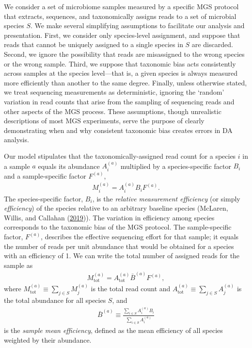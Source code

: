 \documentclass[
]{article}
\begin{document}
We consider a set of microbiome samples measured by a specific MGS protocol that extracts, sequences, and taxonomically assigns reads to a set of microbial species \(S\).
We make several simplifying assumptions to facilitate our analysis and presentation.
First, we consider only species-level assignment, and suppose that reads that cannot be uniquely assigned to a single species in \(S\) are discarded.
Second, we ignore the possibility that reads are misassigned to the wrong species or the wrong sample.
Third, we suppose that taxonomic bias acts consistently across samples at the species level---that is, a given species is always measured more efficiently than another to the same degree.
Finally, unless otherwise stated, we treat sequencing measurements as deterministic, ignoring the `random' variation in read counts that arise from the sampling of sequencing reads and other aspects of the MGS process.
These assumptions, though unrealistic descriptions of most MGS experiments, serve the purpose of clearly demonstrating when and why consistent taxonomic bias creates errors in DA analysis.

Our model stipulates that the taxonomically-assigned read count for a species \(i\) in a sample \(a\) equals its abundance \(A_{i}^{(a)}\) multiplied by a species-specific factor \(B_{i}\) and a sample-specific factor \(F^{(a)}\),
\begin{align}
  \label{eq:mgs-model}
  M_i^{(a)} = A_i^{(a)} B_i F^{(a)}.
\end{align}
The species-specific factor, \(B_{i}\), is the \emph{relative measurement efficiency} (or simply \emph{efficiency}) of the species relative to an arbitrary baseline species (McLaren, Willis, and Callahan (\protect\hyperlink{ref-mclaren2019cons}{2019})).
The variation in efficiency among species corresponds to the taxonomic bias of the MGS protocol.
The sample-specific factor, \(F^{(a)}\), describes the effective sequencing effort for that sample; it equals the number of reads per unit abundance that would be obtained for a species with an efficiency of 1.
We can write the total number of assigned reads for the sample as
\begin{align}
  \label{eq:total-reads}
  M_{\text{tot}}^{(a)}
    = A_{\text{tot}}^{(a)} \bar B^{(a)} F^{(a)},
\end{align}
where
\(M_{{\text{tot}}}^{(a)} \equiv \sum_{j\in S} M_j^{(a)}\) is the total read count and \(A_{{\text{tot}}}^{(a)} \equiv \sum_{j\in S}A_j^{(a)}\) is the total abundance for all species \(S\), and
\begin{align}
  \label{eq:mean-efficiency}
  \bar B^{(a)} \equiv \frac{\sum_{i\in S} A_i^{(a)} B_i}{\sum_{i\in S} A_i^{(a)}}
\end{align}
is the \emph{sample mean efficiency}, defined as the mean efficiency of all species weighted by their abundance.
\end{document}
